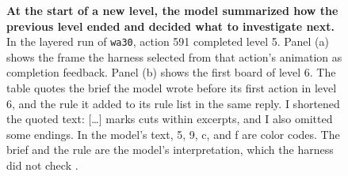 \begin{figure}[htbp]
\caption{\textbf{At the start of a new level, the model summarized how the previous level ended and decided what to investigate next.} In the layered run of \texttt{wa30}, action 591 completed level 5. Panel (a) shows the frame the harness selected from that action's animation as completion feedback. Panel (b) shows the first board of level 6. The table quotes the brief the model wrote before its first action in level 6, and the rule it added to its rule list in the same reply. I shortened the quoted text: [\ldots] marks cuts within excerpts, and I also omitted some endings. In the model's text, 5, 9, c, and f are color codes. The brief and the rule are the model's interpretation, which the harness did not check \citep{dai2026runfigures}.}\label{fig:level-brief}
\end{figure}
